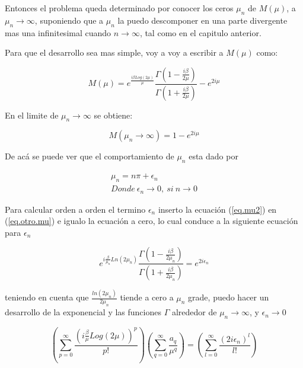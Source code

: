 Entonces el problema queda determinado por conocer los ceros $\mu _n$ de $M(\mu)$, a $\mu _n \rightarrow{\infty}$, suponiendo que a $\mu _n$ la puedo descomponer en una parte divergente mas una infinitesimal cuando $n \rightarrow{\infty}$, tal como en el capitulo anterior.


Para que el desarrollo sea mas simple, voy a voy a escribir a $M (\mu)$ como:

\begin{equation}
M (\mu) = e ^{\frac{i \beta Log(2 \mu)}{\mu}}
\frac{\Gamma (1- \frac{i \beta}{2 \mu})}{\Gamma (1 + \frac{i \beta}{2 \mu})}
- e ^{2 i \mu}
\label{eq.otro.mu}
\end{equation}


En el limite de $\mu _n \rightarrow \infty$ se obtiene:

\begin{equation}
    M(\mu _n \rightarrow \infty) = 
	1 - e ^{2 i \mu}
\end{equation}

De acá se puede ver que el comportamiento de $\mu _n$ esta dado por 


\begin{equation}
\begin{array}{c}
    \mu _n = n \pi + \epsilon _n \\
    Donde \ \epsilon _n \rightarrow{0} ,\ si \ n \rightarrow{0}
\end{array}
\label{eq.mu2}
\end{equation}



Para calcular orden a orden el termino $\epsilon _n$ inserto la ecuación (\ref{eq.mu2}) en (\ref{eq.otro.mu}) e igualo la ecuación a cero, lo cual conduce a la siguiente ecuación para $\epsilon _n$

\begin{equation}
	e ^{ i \frac{\beta}{ \mu _n} Ln(2 \mu _n)}     
    \frac{\Gamma(1 - \frac{i \beta}{2  \mu _n} ) }
    {\Gamma(1 +  \frac{i \beta}{2  \mu _n} )} =    
    e ^{2 i \epsilon _n }
\end{equation}

teniendo en cuenta que $\frac{ln(2 \mu _n)}{2 \mu _n }$ tiende a cero a $\mu _n$ grade, puedo hacer un desarrollo de la exponencial y las funciones $\Gamma$ alrededor de $ \mu _n \rightarrow \infty $, y $\epsilon _n \rightarrow 0$

\begin{equation}
    \left(
    \sum _{p = 0} ^{\infty} \frac{ \left( i \frac{\beta}{ \mu} Log(2 \mu ) \right) ^p }{p!}
    \right)
    \left(
	\sum _{q = 0} ^{\infty} \frac{a _q}{\mu ^q}
	\right)
    =
    \left(
    \sum _{l = 0} ^{\infty} \frac{( 2 i \epsilon _n)^l}{l !}
    \right)
\end{equation}


